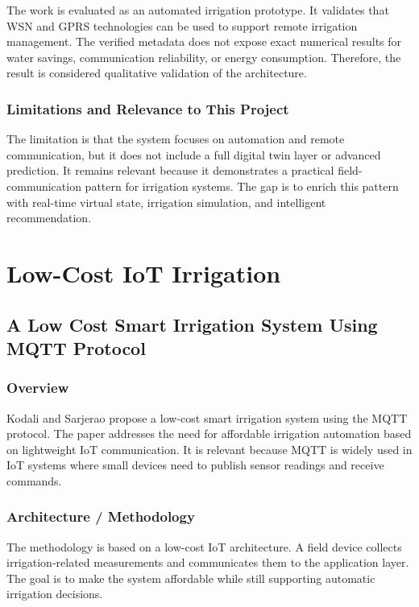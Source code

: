 The work is evaluated as an automated irrigation prototype. It validates that WSN and GPRS technologies can be used to support remote irrigation management. The verified metadata does not expose exact numerical results for water savings, communication reliability, or energy consumption. Therefore, the result is considered qualitative validation of the architecture.

\subsubsection{Limitations and Relevance to This Project}

The limitation is that the system focuses on automation and remote communication, but it does not include a full digital twin layer or advanced prediction. It remains relevant because it demonstrates a practical field-communication pattern for irrigation systems. The gap is to enrich this pattern with real-time virtual state, irrigation simulation, and intelligent recommendation.

\section{Low-Cost IoT Irrigation}

\subsection[A Low Cost Smart Irrigation System Using MQTT Protocol]{A Low Cost Smart Irrigation System Using MQTT Protocol \cite{kodali2017mqttirrigation}}

\subsubsection{Overview}

Kodali and Sarjerao propose a low-cost smart irrigation system using the MQTT protocol. The paper addresses the need for affordable irrigation automation based on lightweight IoT communication. It is relevant because MQTT is widely used in IoT systems where small devices need to publish sensor readings and receive commands.

\subsubsection{Architecture / Methodology}

The methodology is based on a low-cost IoT architecture. A field device collects irrigation-related measurements and communicates them to the application layer. The goal is to make the system affordable while still supporting automatic irrigation decisions.

